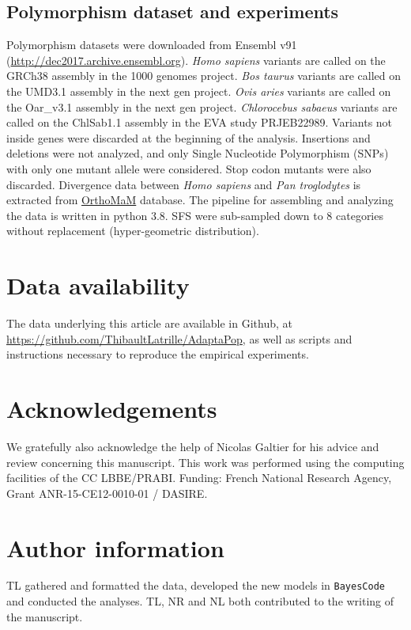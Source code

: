 \documentclass{article}
\begin{document}
\subsection*{Polymorphism dataset and experiments}
Polymorphism datasets were downloaded from Ensembl v91 (\url{http://dec2017.archive.ensembl.org}).
\textit{Homo sapiens} variants are called on the GRCh38 assembly in the 1000 genomes project\cite{consortium_integrated_2012, the_1000_genomes_project_consortium_global_2015}.
\textit{Bos taurus} variants are called on the UMD3.1 assembly in the next gen project.
\textit{Ovis aries} variants are called on the Oar\_v3.1 assembly in the next gen project.
\textit{Chlorocebus sabaeus} variants are called on the ChlSab1.1 assembly in the EVA study PRJEB22989\cite{svardal_ancient_2017}.
Variants not inside genes were discarded at the beginning of the analysis.
Insertions and deletions were not analyzed, and only Single Nucleotide Polymorphism (SNPs) with only one mutant allele were considered.
Stop codon mutants were also discarded.
Divergence data between \textit{Homo sapiens} and \textit{Pan troglodytes} is extracted from \href{http://www.orthomam.univ-montp2.fr}{OrthoMaM} database\cite{ranwez_orthomam_2007, douzery_orthomam_2014, scornavacca_orthomam_2019}.
The pipeline for assembling and analyzing the data is written in python 3.8.
SFS were sub-sampled down to $8$ categories without replacement (hyper-geometric distribution).

\section{Data availability}
The data underlying this article are available in Github, at \url{https://github.com/ThibaultLatrille/AdaptaPop}, as well as scripts and instructions necessary to reproduce the empirical experiments.

\section{Acknowledgements}
We gratefully also acknowledge the help of Nicolas Galtier for his advice and review concerning this manuscript.
This work was performed using the computing facilities of the CC LBBE/PRABI.
Funding: French National Research Agency, Grant ANR-15-CE12-0010-01 / DASIRE.

\section{Author information}
TL gathered and formatted the data, developed the new models in \texttt{BayesCode} and conducted the analyses.
TL, NR and NL both contributed to the writing of the manuscript.
\end{document}
